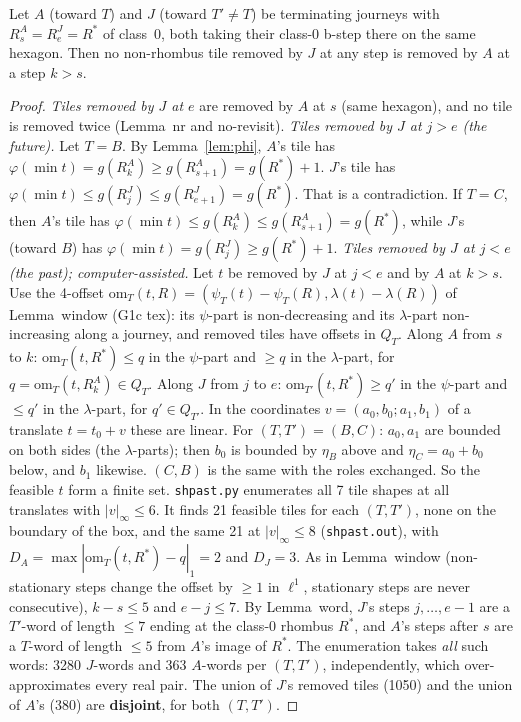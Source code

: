\documentclass[11pt]{article}
\theoremstyle{definition}\newtheorem{definition}[theorem]{Definition}\newtheorem{remark}[theorem]{Remark}
\begin{document}
\begin{proposition}\label{prop:sh3}
Let $A$ (toward $T$) and $J$ (toward $T'\ne T$) be terminating journeys with $R^A_s=R^J_e=R^\ast$ of class~0, both taking their class-0 b-step there on the same hexagon. Then no non-rhombus tile removed by $J$ at any step is removed by $A$ at a step $k>s$.
\end{proposition}
\begin{proof}
\emph{Tiles removed by $J$ at $e$} are removed by $A$ at $s$ (same hexagon), and no tile is removed twice (Lemma~nr and no-revisit).
\emph{Tiles removed by $J$ at $j>e$ (the future).} Let $T=B$. By Lemma~\ref{lem:phi}, $A$'s tile has $\varphi(\min t)=g(R^A_k)\ge g(R^A_{s+1})=g(R^\ast)+1$. $J$'s tile has $\varphi(\min t)\le g(R^J_j)\le g(R^J_{e+1})=g(R^\ast)$. That is a contradiction. If $T=C$, then $A$'s tile has $\varphi(\min t)\le g(R^A_k)\le g(R^A_{s+1})=g(R^\ast)$, while $J$'s (toward $B$) has $\varphi(\min t)=g(R^J_j)\ge g(R^\ast)+1$.
\emph{Tiles removed by $J$ at $j<e$ (the past); computer-assisted.} Let $t$ be removed by $J$ at $j<e$ and by $A$ at $k>s$. Use the 4-offset $\mathrm{om}_T(t,R)=(\psi_T(t)-\psi_T(R),\lambda(t)-\lambda(R))$ of Lemma~window (G1c tex): its $\psi$-part is non-decreasing and its $\lambda$-part non-increasing along a journey, and removed tiles have offsets in $Q_T$.
Along $A$ from $s$ to $k$: $\mathrm{om}_T(t,R^\ast)\le q$ in the $\psi$-part and $\ge q$ in the $\lambda$-part, for $q=\mathrm{om}_T(t,R^A_k)\in Q_T$. Along $J$ from $j$ to $e$: $\mathrm{om}_{T'}(t,R^\ast)\ge q'$ in the $\psi$-part and $\le q'$ in the $\lambda$-part, for $q'\in Q_{T'}$.
In the coordinates $v=(a_0,b_0;a_1,b_1)$ of a translate $t=t_0+v$ these are linear. For $(T,T')=(B,C)$: $a_0,a_1$ are bounded on both sides (the $\lambda$-parts); then $b_0$ is bounded by $\eta_B$ above and $\eta_C=a_0+b_0$ below, and $b_1$ likewise. $(C,B)$ is the same with the roles exchanged. So the feasible $t$ form a finite set.
\texttt{shpast.py} enumerates all 7 tile shapes at all translates with $|v|_\infty\le6$. It finds 21 feasible tiles for each $(T,T')$, none on the boundary of the box, and the same 21 at $|v|_\infty\le8$ (\texttt{shpast.out}), with $D_A=\max|\mathrm{om}_T(t,R^\ast)-q|_1=2$ and $D_J=3$. As in Lemma~window (non-stationary steps change the offset by $\ge1$ in $\ell^1$, stationary steps are never consecutive), $k-s\le5$ and $e-j\le7$.
By Lemma~word, $J$'s steps $j,\dots,e-1$ are a $T'$-word of length $\le7$ ending at the class-0 rhombus $R^\ast$, and $A$'s steps after $s$ are a $T$-word of length $\le5$ from $A$'s image of $R^\ast$. The enumeration takes \emph{all} such words: 3280 $J$-words and 363 $A$-words per $(T,T')$, independently, which over-approximates every real pair. The union of $J$'s removed tiles (1050) and the union of $A$'s (380) are \textbf{disjoint}, for both $(T,T')$.
\end{proof}
\end{document}
